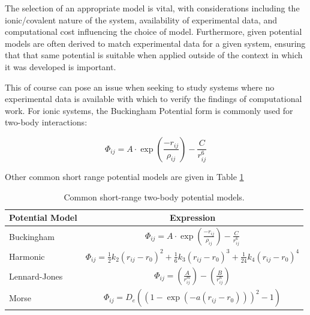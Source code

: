 The selection of an appropriate model is vital, with considerations including the ionic/covalent nature of the system, availability of experimental data, and computational cost influencing the choice of model.
Furthermore, given potential models are often derived to match experimental data for a given system, ensuring that that same potential is suitable when applied outside of the context in which it was developed is important.

This of course can pose an issue when seeking to study systems where no experimental data is available with which to verify the findings of computational work.
 For ionic systems, the Buckingham Potential form is commonly used for two-body interactions:


\begin{equation}
\Phi_{ij} = A\cdot \exp \left(\frac{-r_{ij}}{\rho_{ij}} \right) - \frac{C}{r_{ij}^6}
\label{eq:Buckingham}
\end{equation}

\noindent Other common short range potential models are given in Table \ref{tab:potentialmodels}

\newpage

\begin{table}[t]
  \centering
  \caption{Common short-range two-body potential models.\cite{Gale2003}}
  \label{tab:potentialmodels}
  \begin{tabular}{@{}lc@{}}
  \toprule
  Potential Model         & Expression     \\
  \midrule
  Buckingham              & $\displaystyle{\Phi_{ij} = A\cdot \exp \left(\frac{-r_{ij}}{\rho_{ij}} \right) - \frac{C}{r_{ij}^6}}$    \\
  \addlinespace
  Harmonic                & $\displaystyle{\Phi_{ij} = \frac{1}{2}k_2(r_{ij}-r_0)^2   + \frac{1}{6}k_3(r_{ij}-r_0)^3    + \frac{1}{24}k_4(r_{ij}-r_0)^4   }$    \\
  \addlinespace
  Lennard-Jones           & $\displaystyle{\Phi_{ij} = \left(\frac{A}{r_{ij}^m} \right) - \left( \frac{B}{r_{ij}^n}\right)}$   \\
  \addlinespace
  Morse                   & $\displaystyle{\Phi_{ij} = D_e \left((1- \exp(-a(r_{ij} - r_0)))^2           -1\right) }$    \\
  \bottomrule
  \end{tabular}
\end{table}

\vspace{-5pt}

